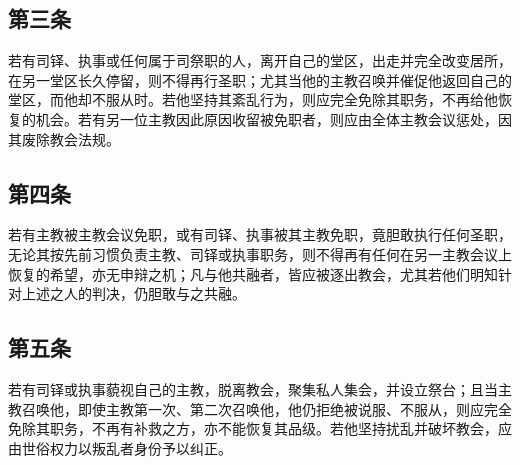 \subsection{第三条}

若有司铎、执事或任何属于司祭职的人，离开自己的堂区，出走并完全改变居所，在另一堂区长久停留，则不得再行圣职；尤其当他的主教召唤并催促他返回自己的堂区，而他却不服从时。若他坚持其紊乱行为，则应完全免除其职务，不再给他恢复的机会。若有另一位主教因此原因收留被免职者，则应由全体主教会议惩处，因其废除教会法规。\par

\par


\subsection{第四条}

若有主教被主教会议免职，或有司铎、执事被其主教免职，竟胆敢执行任何圣职，无论其按先前习惯负责主教、司铎或执事职务，则不得再有任何在另一主教会议上恢复的希望，亦无申辩之机；凡与他共融者，皆应被逐出教会，尤其若他们明知针对上述之人的判决，仍胆敢与之共融。\par

\par


\subsection{第五条}

若有司铎或执事藐视自己的主教，脱离教会，聚集私人集会，并设立祭台；且当主教召唤他，即使主教第一次、第二次召唤他，他仍拒绝被说服、不服从，则应完全免除其职务，不再有补救之方，亦不能恢复其品级。若他坚持扰乱并破坏教会，应由世俗权力以叛乱者身份予以纠正。\par


